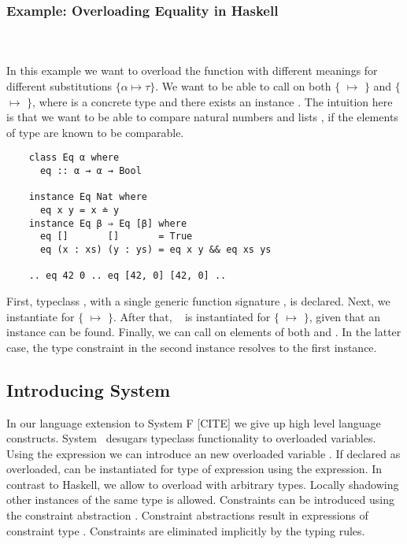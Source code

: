 \subsubsection{Example: Overloading Equality in Haskell}\hfill\\\\
In this example we want to overload the function  with different meanings for different substitutions $\{α \mapsto τ\}$.
We want to be able to call  on both $\{$ $\mapsto$ $\}$ and $\{$ $\mapsto$ \inl{[β]}$\}$, where  is a concrete type and there exists an instance . The intuition here is that we want to be able to compare natural numbers  and lists \mono{[β]}, if the elements of type  are known to be comparable.
\begin{verbatim}
    class Eq α where
      eq :: α → α → Bool 

    instance Eq Nat where
      eq x y = x ≐ y
    instance Eq β ⇒ Eq [β] where
      eq []       []       = True
      eq (x : xs) (y : ys) = eq x y && eq xs ys 

    .. eq 42 0 .. eq [42, 0] [42, 0] ..
\end{verbatim}
First, typeclass , with a single generic function signature , is declared. Next, we instantiate  for $\{$ $\mapsto$ $\}$. 
After that, \  is instantiated for $\{$ $\mapsto$ \inl{[β]}$\}$, given that an instance  can be found.
Finally, we can call  on elements of both  and \inl{[Nat]}. In the latter case, the type constraint  in the second instance resolves to the first instance.

\subsection{Introducing System \Fo}
In our language extension to System F [CITE] we give up high level language constructs. 
System \Fo\ desugars typeclass functionality to overloaded variables. 
Using the  expression we can introduce an new overloaded variable . 
If declared as overloaded,  can be instantiated for type  of expression  using the  expression.
In contrast to Haskell, we allow to overload  with arbitrary types. 
Locally shadowing other instances of the same type is allowed.
Constraints can be introduced using the constraint abstraction . Constraint abstractions result in expressions of constraint type . 
Constraints are eliminated implicitly by the typing rules.

